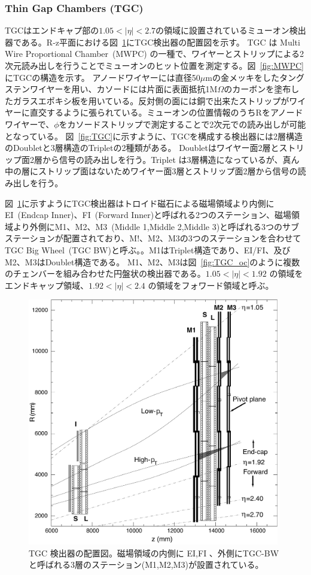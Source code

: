 \subsubsection{Thin Gap Chambers (TGC)}
TGCはエンドキャプ部の$1.05 < |\eta| < 2.7$の領域に設置されているミューオン検出器である。R-z平面における図~\ref{fig:TGC_st}にTGC検出器の配置図を示す。
TGC は Multi Wire Proportional Chamber~(MWPC) の一種で、ワイヤーとストリップによる2 次元読み出しを行うことでミューオンのヒット位置を測定する。図~\ref{fig:MWPC}にTGCの構造を示す。
アノードワイヤーには直径50$\mu$mの金メッキをしたタングステンワイヤーを用い、カソードには片面に表面抵抗1M$\Omega$のカーボンを塗布したガラスエポキシ板を用いている。反対側の面には銅で出来たストリップがワイヤーに直交するように張られている。ミューオンの位置情報のうちRをアノードワイヤーで、$\phi$をカソードストリップで測定することで2次元での読み出しが可能となっている。
図~\ref{fig:TGC}に示すように、TGCを構成する検出器には2層構造のDoubletと3層構造のTripletの2種類がある。
Doubletはワイヤー面2層とストリップ面2層から信号の読み出しを行う。Triplet は3層構造になっているが、真ん中の層にストリップ面はないためワイヤー面3層とストリップ面2層から信号の読み出しを行う。

図~\ref{fig:TGC_st}に示すようにTGC検出器はトロイド磁石による磁場領域より内側にEI~(Endcap Inner)、FI~(Forward Inner)と呼ばれる2つのステーション、磁場領域より外側にM1、M2、M3~(Middle 1,Middle 2,Middle 3)と呼ばれる3つのサブステーションが配置されており、M!、M2、M3の3つのステーションを合わせてTGC Big Wheel~(TGC BW)と呼ぶ。。M1はTriplet構造であり、EI/FI、及びM2、M3はDoublet構造である。
M1、M2、M3は図~\ref{fig:TGC_oc}のように複数のチェンバーを組み合わせた円盤状の検出器である。$1.05 < |\eta| < 1.92$ の領域をエンドキャップ領域、$1.92 < |\eta| < 2.4$ の領域をフォワード領域と呼ぶ。


\begin{figure}[tb]
  \centering
  \includegraphics[clip, width=11cm]{fig/2/l1mue-schema.pdf}
  \caption{TGC 検出器の配置図\cite{Aad:1129811}。磁場領域の内側に EI,FI 、外側にTGC-BWと呼ばれる3層のステーション(M1,M2,M3)が設置されている。}
  \label{fig:TGC_st}
\end{figure}

